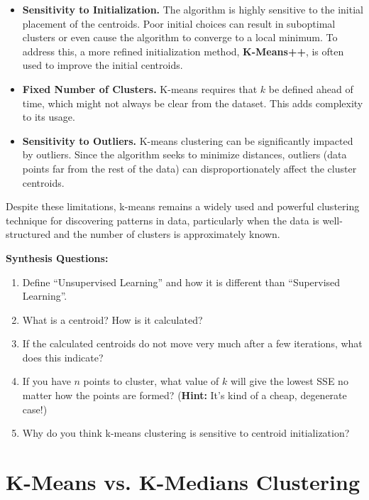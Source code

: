     \begin{itemize}
        \item \textbf{Sensitivity to Initialization.} The algorithm is highly sensitive to the initial placement of the centroids. Poor initial choices can result in suboptimal clusters or even cause the algorithm to converge to a local minimum. To address this, a more refined initialization method, \textbf{K-Means++}, is often used to improve the initial centroids.
        
        \item \textbf{Fixed Number of Clusters.} K-means requires that \( k \) be defined ahead of time, which might not always be clear from the dataset. This adds complexity to its usage.
        
        \item \textbf{Sensitivity to Outliers.} K-means clustering can be significantly impacted by outliers. Since the algorithm seeks to minimize distances, outliers (data points far from the rest of the data) can disproportionately affect the cluster centroids.
    \end{itemize}
    
    Despite these limitations, k-means remains a widely used and powerful clustering technique for discovering patterns in data, particularly when the data is well-structured and the number of clusters is approximately known.

\begin{questionbox}
\textbf{Synthesis Questions:}
\begin{enumerate}
    \item Define ``Unsupervised Learning'' and how it is different than ``Supervised Learning''.
    \item What is a centroid? How is it calculated?
    \item If the calculated centroids do not move very much after a few iterations, what does this indicate?
    \item If you have $n$ points to cluster, what value of $k$ will give the lowest SSE no matter how the points are formed? (\textbf{Hint:} It's kind of a cheap, degenerate case!)
    \item Why do you think k-means clustering is sensitive to centroid initialization?
\end{enumerate}
\end{questionbox}

\section{K-Means vs. K-Medians Clustering}
